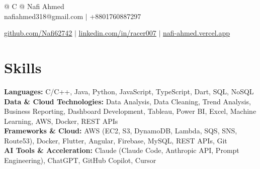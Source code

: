 \documentclass[a4paper,8pt]{article}
\begin{document}
\pagestyle{empty}

\begin{tabularx}{\linewidth}{@{} C @{}}
\color[HTML]{1C033C} \Huge{Nafi Ahmed} \\[3.5pt]
\textcolor[HTML]{371e77}{{{{\faEnvelope} nafiahmed318@gmail.com}} $|$}
\textcolor[HTML]{371e77}{{{\faMobile} +8801760887297}}

\textcolor[HTML]{371e77}{\underline{{\raisebox{-0.05\height}{\faGithub} \href{https://github.com/Nafi62742}{github.com/Nafi62742}}} $|$}
\textcolor[HTML]{371e77}{\underline{{\raisebox{-0.05\height}{\faLinkedin} \href{https://linkedin.com/in/racer007}{linkedin.com/in/racer007}}} $|$}
\textcolor[HTML]{371e77}{\underline{{\raisebox{-0.05\height}{\faGlobe} \href{https://nafi-ahmed.vercel.app}{nafi-ahmed.vercel.app}}}}
\end{tabularx}

\vfill
\section{Skills}
\color[HTML]{1C033C}\textbf{Languages:} C/C++, Java, Python, JavaScript, TypeScript, Dart, SQL, NoSQL\\[1.5pt]
\color[HTML]{1C033C}\textbf{Data \& Cloud Technologies:} Data Analysis, Data Cleaning, Trend Analysis, Business Reporting, Dashboard Development, Tableau, Power BI, Excel, Machine Learning, AWS, Docker, REST APIs\\[1.5pt]
\color[HTML]{1C033C}\textbf{Frameworks \& Cloud:} AWS (EC2, S3, DynamoDB, Lambda, SQS, SNS, Route53), Docker, Flutter, Angular, Firebase, MySQL, REST APIs, Git\\[1.5pt]
\color[HTML]{1C033C}\textbf{AI Tools \& Acceleration:} Claude (Claude Code, Anthropic API, Prompt Engineering), ChatGPT, GitHub Copilot, Cursor

\vfill
\end{document}
